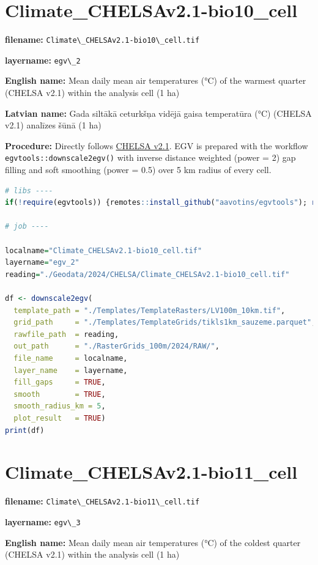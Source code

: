 \documentclass[
]{book}
\newcommand{\passthrough}[1]{#1}
\begin{document}
\section{Climate\_CHELSAv2.1-bio10\_cell}\label{ch06.002}

\textbf{filename:} \passthrough{\lstinline!Climate\_CHELSAv2.1-bio10\_cell.tif!}

\textbf{layername:} \passthrough{\lstinline!egv\_2!}

\textbf{English name:} Mean daily mean air temperatures (°C) of the warmest quarter (CHELSA v2.1) within the analysis cell (1 ha)

\textbf{Latvian name:} Gada siltākā ceturkšņa vidējā gaisa temperatūra (°C) (CHELSA v2.1) analīzes šūnā (1 ha)

\textbf{Procedure:} Directly follows \hyperref[Ch04.11]{CHELSA v2.1}. EGV is prepared with the
workflow \passthrough{\lstinline!egvtools::downscale2egv()!} with inverse distance weighted (power = 2)
gap filling and soft smoothing (power = 0.5) over 5 km radius of every cell.

\begin{lstlisting}[language=R]
# libs ----
if(!require(egvtools)) {remotes::install_github("aavotins/egvtools"); require(egvtools)}

# job ----

localname="Climate_CHELSAv2.1-bio10_cell.tif"
layername="egv_2"
reading="./Geodata/2024/CHELSA/Climate_CHELSAv2.1-bio10_cell.tif"

df <- downscale2egv(
  template_path = "./Templates/TemplateRasters/LV100m_10km.tif",
  grid_path     = "./Templates/TemplateGrids/tikls1km_sauzeme.parquet",
  rawfile_path  = reading,
  out_path      = "./RasterGrids_100m/2024/RAW/",
  file_name     = localname,
  layer_name    = layername,
  fill_gaps     = TRUE,
  smooth        = TRUE,
  smooth_radius_km = 5,
  plot_result   = TRUE)
print(df)
\end{lstlisting}

\section{Climate\_CHELSAv2.1-bio11\_cell}\label{ch06.003}

\textbf{filename:} \passthrough{\lstinline!Climate\_CHELSAv2.1-bio11\_cell.tif!}

\textbf{layername:} \passthrough{\lstinline!egv\_3!}

\textbf{English name:} Mean daily mean air temperatures (°C) of the coldest quarter (CHELSA v2.1) within the analysis cell (1 ha)
\end{document}
